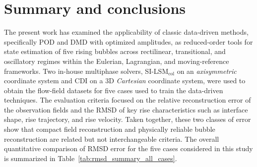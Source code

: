 \documentclass[a4paper,fleqn]{cas-sc}
\begin{document}
	\section{Summary and conclusions}
	\label{Conclusion}
	
	The present work has examined the applicability of classic data-driven methods, specifically POD and DMD with optimized amplitudes, as reduced-order tools for state estimation of five rising bubbles across rectilinear, transitional, and oscillatory regimes within the Eulerian, Lagrangian, and moving-reference frameworks. Two in-house multiphase solvers, SI-LSM$_{\text{col}}$ on an \textit{axisymmetric} coordinate system and CDI on a 3D \textit{Cartesian} coordinate system, were used to obtain the flow-field datasets for five cases used to train the data-driven techniques. The evaluation criteria focused on the relative reconstruction error of the observation fields and the RMSD of key rise characteristics such as interface shape, rise trajectory, and rise velocity. Taken together, these two classes of error show that compact field reconstruction and physically reliable bubble reconstruction are related but not interchangeable criteria. The overall quantitative comparison of RMSD error for the five cases considered in this study is summarized in Table~\ref{tab:rmsd_summary_all_cases}. 
	
\end{document}

